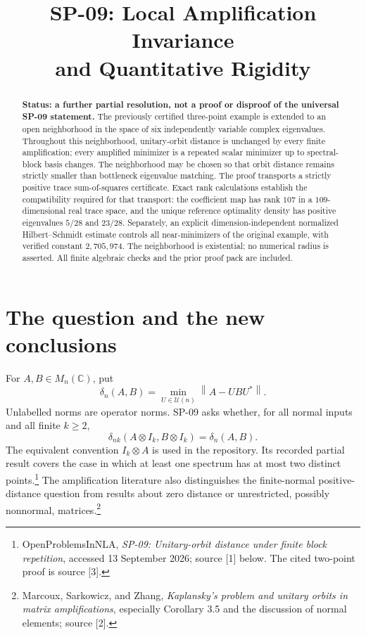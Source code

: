 \documentclass[11pt]{article}
\title{SP-09: Local Amplification Invariance\\and Quantitative Rigidity}
\author{}
\date{}
\theoremstyle{remark}\newtheorem{remark}[theorem]{Remark}
\newcommand{\C}{\mathbb C}
\newcommand{\U}{\mathcal U}
\newcommand{\norm}[1]{\left\lVert#1\right\rVert}
\begin{document}
\maketitle
\vspace{-1.4em}
\begin{abstract}
\noindent\textbf{Status: a further partial resolution, not a proof or disproof of the universal SP-09 statement.}
The previously certified three-point example is extended to an open neighborhood in the space of six independently variable complex eigenvalues. Throughout this neighborhood, unitary-orbit distance is unchanged by every finite amplification; every amplified minimizer is a repeated scalar minimizer up to spectral-block basis changes. The neighborhood may be chosen so that orbit distance remains strictly smaller than bottleneck eigenvalue matching. The proof transports a strictly positive trace sum-of-squares certificate. Exact rank calculations establish the compatibility required for that transport: the coefficient map has rank $107$ in a $109$-dimensional real trace space, and the unique reference optimality density has positive eigenvalues $5/28$ and $23/28$. Separately, an explicit dimension-independent normalized Hilbert--Schmidt estimate controls all near-minimizers of the original example, with verified constant $2{,}705{,}974$. The neighborhood is existential; no numerical radius is asserted. All finite algebraic checks and the prior proof pack are included.
\end{abstract}

\section{The question and the new conclusions}
For $A,B\in M_n(\C)$, put
\[
 \delta_n(A,B)=\min_{U\in\U(n)}\norm{A-UBU^*}.
\]
Unlabelled norms are operator norms. SP-09 asks whether, for all normal inputs and all finite $k\ge2$,
\begin{equation}\label{eq:universal}
 \delta_{nk}(A\otimes I_k,B\otimes I_k)=\delta_n(A,B).
\end{equation}
The equivalent convention $I_k\otimes A$ is used in the repository. Its recorded partial result covers the case in which at least one spectrum has at most two distinct points.\footnote{OpenProblemsInNLA, \emph{SP-09: Unitary-orbit distance under finite block repetition}, accessed 13 September 2026; source [1] below. The cited two-point proof is source [3].} The amplification literature also distinguishes the finite-normal positive-distance question from results about zero distance or unrestricted, possibly nonnormal, matrices.\footnote{Marcoux, Sarkowicz, and Zhang, \emph{Kaplansky's problem and unitary orbits in matrix amplifications}, especially Corollary 3.5 and the discussion of normal elements; source [2].}
\end{document}
